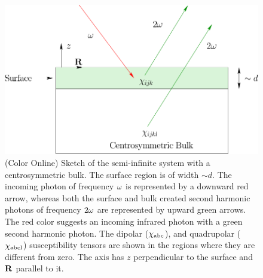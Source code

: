\documentclass[floatfix,prb,aps,superscriptaddress,11pt,preprint,letterpaper]{revtex4}
\begin{document}
\begin{figure}[t]
\centering
\includegraphics[scale=0.6]{images/system}
\caption{(Color Online) Sketch of the semi-infinite system with a 
centrosymmetric bulk. The surface region is of width $\sim d$. 
The incoming photon of frequency $\omega$ is represented by
a downward red arrow, whereas both the surface and bulk created second
harmonic photons of frequency $2\omega$ are represented by upward
green arrows. The red color suggests an incoming infrared photon with
a green second harmonic photon. The dipolar ($\chi_{\mathrm{a}\mathrm{b}\mathrm{c}}$), and 
quadrupolar ($\chi_{\mathrm{a}\mathrm{b}\mathrm{c}\mathrm{l}}$) susceptibility tensors are shown 
in the regions where they are different from zero. The axis has $z$
perpendicular to the surface and $\mathbf{R}$ parallel to it.\label{fsystem}}
\end{figure}
\end{document}
